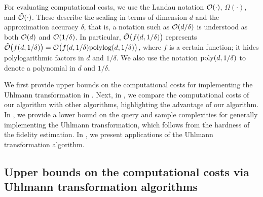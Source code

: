 


For evaluating computational costs, we use the Landau notation ${\mathcal{O}}(\cdot)$, $\Omega(\cdot)$, and $\tilde{{\mathcal{O}}}(\cdot)$. These describe the scaling in terms of dimension $d$ and the approximation accuracy $\delta$, that is, a notation such as ${\mathcal{O}}(d/\delta)$ is understood as both ${\mathcal{O}}(d)$ and ${\mathcal{O}}(1/\delta)$.
In particular, $\tilde{{\mathcal{O}}}\big(f(d, 1/\delta)\big)$ represents $\tilde{{\mathcal{O}}}\big(f(d, 1/\delta)\big) = {\mathcal{O}}\big(f(d, 1/\delta) {\rm polylog}(d, 1/\delta)\big)$,
where $f$ is a certain function; it hides polylogarithmic factors in $d$ and $1/\delta$. 
We also use the notation $\mathrm{poly}(d, 1/\delta)$ to denote a polynomial in $d$ and $1/\delta$.





We first provide upper bounds on the computational costs for implementing the Uhlmann transformation in .
Next, in , we compare the computational costs of our algorithm with other algorithms, highlighting the advantage of our algorithm.
In , we provide a lower bound on the query and sample complexities for generally implementing the Uhlmann transformation, which follows from the hardness of the fidelity estimation.
In , we present applications of the Uhlmann transformation algorithm.
















\subsection{Upper bounds on the computational costs via Uhlmann transformation algorithms}
\label{sec:upper bound uhl}



